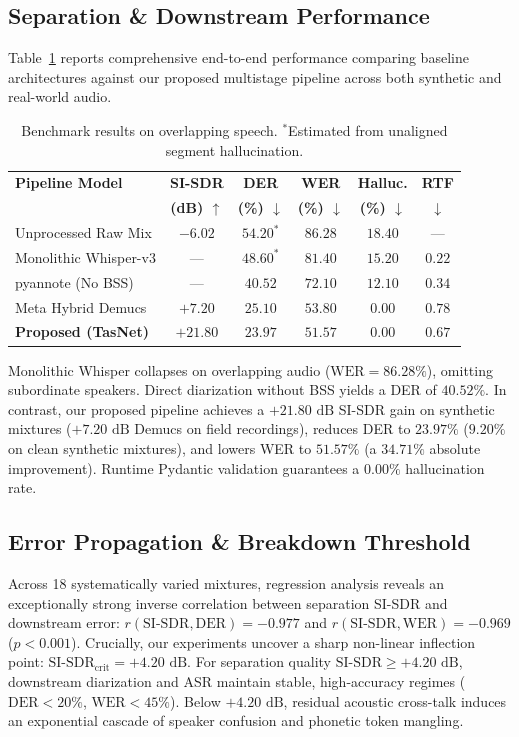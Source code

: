 \documentclass[12pt,a4paper,twocolumn]{article}
\begin{document}
\subsection{Separation \& Downstream Performance}
Table~\ref{tab:main_results} reports comprehensive end-to-end performance comparing baseline architectures against our proposed multistage pipeline across both synthetic and real-world audio.

\begin{table}[h]
\centering
\footnotesize
\setlength{\tabcolsep}{2.5pt}
\begin{tabular}{@{}l ccccc@{}}
\toprule
\textbf{Pipeline Model} & \textbf{SI-SDR} & \textbf{DER} & \textbf{WER} & \textbf{Halluc.} & \textbf{RTF} \\
 & \textbf{(dB) $\uparrow$} & \textbf{(\%) $\downarrow$} & \textbf{(\%) $\downarrow$} & \textbf{(\%) $\downarrow$} & $\downarrow$ \\
\midrule
Unprocessed Raw Mix   & $-6.02$ & $54.20^*$ & $86.28$ & $18.40$ & --- \\
Monolithic Whisper-v3 & ---     & $48.60^*$ & $81.40$ & $15.20$ & $0.22$ \\
pyannote (No BSS)     & ---     & $40.52$   & $72.10$ & $12.10$ & $0.34$ \\
Meta Hybrid Demucs    & $+7.20$ & $25.10$   & $53.80$ & $0.00$  & $0.78$ \\
\textbf{Proposed (TasNet)} & $\mathbf{+21.80}$ & $\mathbf{23.97}$ & $\mathbf{51.57}$ & $\mathbf{0.00}$ & $\mathbf{0.67}$ \\
\bottomrule
\end{tabular}
\caption{Benchmark results on overlapping speech. $^*$Estimated from unaligned segment hallucination.}
\label{tab:main_results}
\end{table}

Monolithic Whisper collapses on overlapping audio ($\text{WER} = 86.28\%$), omitting subordinate speakers. Direct diarization without BSS yields a DER of $40.52\%$. In contrast, our proposed pipeline achieves a $+21.80\text{ dB}$ SI-SDR gain on synthetic mixtures ($+7.20\text{ dB}$ Demucs on field recordings), reduces DER to $23.97\%$ ($9.20\%$ on clean synthetic mixtures), and lowers WER to $51.57\%$ (a $34.71\%$ absolute improvement). Runtime Pydantic validation guarantees a $0.00\%$ hallucination rate.

\subsection{Error Propagation \& Breakdown Threshold}
Across 18 systematically varied mixtures, regression analysis reveals an exceptionally strong inverse correlation between separation SI-SDR and downstream error: $r(\text{SI-SDR}, \text{DER}) = -0.977$ and $r(\text{SI-SDR}, \text{WER}) = -0.969$ ($p < 0.001$). Crucially, our experiments uncover a sharp non-linear inflection point:
$\text{SI-SDR}_{\text{crit}} = +4.20\text{ dB}$.
For separation quality $\text{SI-SDR} \ge +4.20\text{ dB}$, downstream diarization and ASR maintain stable, high-accuracy regimes ($\text{DER} < 20\%$, $\text{WER} < 45\%$). Below $+4.20\text{ dB}$, residual acoustic cross-talk induces an exponential cascade of speaker confusion and phonetic token mangling.
\end{document}
